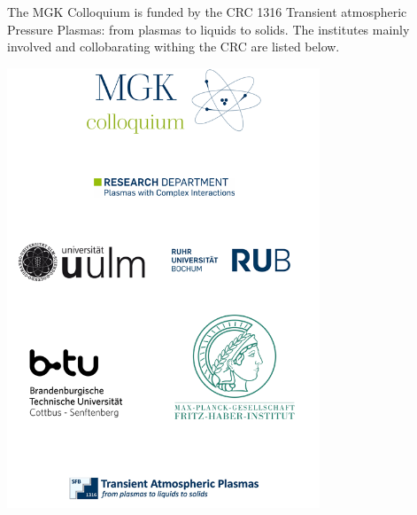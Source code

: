 \begin{center}
The MGK Colloquium is funded by the CRC 1316 Transient atmospheric Pressure Plasmas: from plasmas to liquids to solids.
The institutes mainly involved and collobarating withing the CRC are listed below.
\end{center}

\vfill



\begin{center}
\includegraphics[width=0.7\textwidth]{images/sponsors.png}
\end{center}

\vfill
